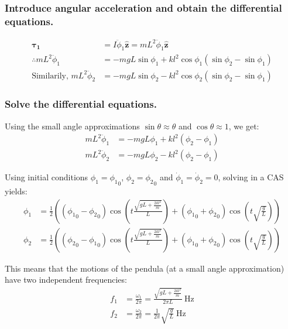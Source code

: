 \documentclass[a4paper]{scrartcl}
\begin{document}
\subsubsection{Introduce angular acceleration and obtain the differential equations.}
\begin{align*}
    \boldsymbol{\tau_1} &= I \ddot{\phi}_1 \mathbf{\hat{z}} = m L^2 \ddot{\phi}_1 \mathbf{\hat{z}} \\
    \therefore m L^2 \ddot{\phi}_1 &= -m g L \sin \phi_1 + k l^2 \cos \phi_1 (\sin \phi_2 - \sin \phi_1) \\
    \text{Similarily, } m L^2 \ddot{\phi}_2 &= -m g L \sin \phi_2 - k l^2 \cos \phi_2 (\sin \phi_2 - \sin \phi_1)
\end{align*}

\subsubsection{Solve the differential equations.}
Using the small angle approximations \(\sin \theta \approx \theta\) and \(\cos \theta \approx 1\), we get:
\begin{align*}
    m L^2 \ddot{\phi}_1 &= -m g L \phi_1 + k l^2 (\phi_2 - \phi_1) \\
    m L^2 \ddot{\phi}_2 &= -m g L \phi_2 - k l^2 (\phi_2 - \phi_1)
\end{align*}

Using initial conditions \(\phi_1 = {\phi_1}_0\), \(\phi_2 = {\phi_2}_0\) and \(\dot{\phi}_1 = \dot{\phi}_2 = 0\), solving in a CAS yields:
\begin{align*}
    \phi_1 &= \frac{1}{2} \left(({\phi_1}_0 - {\phi_2}_0) \cos \left(t \frac{\sqrt{g L + \frac{2 k l^2}{m}}}{L}\right) + ({\phi_1}_0 + {\phi_2}_0) \cos \left(t \sqrt{\frac{g}{L}}\right)\right) \\
    \phi_2 &= \frac{1}{2} \left(({\phi_2}_0 - {\phi_1}_0) \cos \left(t \frac{\sqrt{g L + \frac{2 k l^2}{m}}}{L}\right) + ({\phi_1}_0 + {\phi_2}_0) \cos \left(t \sqrt{\frac{g}{L}}\right)\right)
\end{align*}

This means that the motions of the pendula (at a small angle approximation) have two independent frequencies:
\begin{align*}
    f_1 &= \frac{\omega_1}{2 \pi} = \frac{\sqrt{g L + \frac{2 k l^2}{m}}}{2 \pi L} \:\si{\hertz} \\
    f_2 &= \frac{\omega_2}{2 \pi} = \frac{1}{2 \pi} \sqrt{\frac{g}{L}} \:\si{\hertz}
\end{align*}
\end{document}
